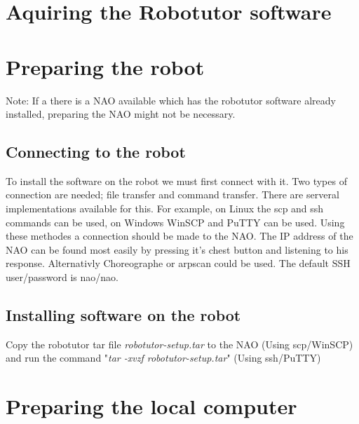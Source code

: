 \section{Aquiring the Robotutor software}

\section{Preparing the robot}
Note: If a there is a NAO available which has the robotutor software already installed, preparing the NAO might not be necessary.

\subsection{Connecting to the robot}
To install the software on the robot we must first connect with it. Two types of connection are needed; file transfer and command transfer. There are serveral implementations available for this. For example, on Linux the scp and ssh commands can be used, on Windows WinSCP and PuTTY can be used. Using these methodes a connection should be made to the NAO. The IP address of the NAO can be found most easily by pressing it's chest button and listening to his response. Alternativly Choreographe or arpscan could be used. The default SSH user/password is nao/nao. 

\subsection{Installing software on the robot}


Copy the robotutor tar file \emph{robotutor-setup.tar} to the NAO  (Using scp/WinSCP) and run the command "\emph{tar -xvzf robotutor-setup.tar}" (Using ssh/PuTTY)

\section{Preparing the local computer}

